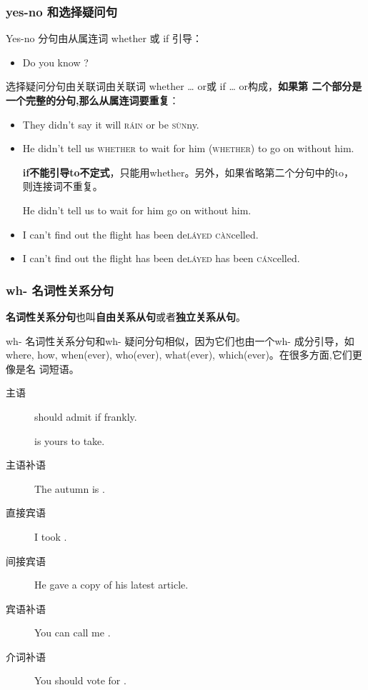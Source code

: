 \subsubsection{yes-no 和选择疑问句}

Yes-no 分句由从属连词 whether 或 if 引导：
\begin{itemize}
\item Do you know ?
\end{itemize}

选择疑问分句由关联词由关联词 whether \ldots{} or或 if \ldots{} or构成，\textbf{如果第
二个部分是一个完整的分句,那么从属连词要重复}：
\begin{itemize}
\item They didn't say  it will \textsc{r\'ain} or be \textsc{s\`un}ny.
\item He didn't tell us \textsc{whether} to wait for him 
  \textsc{(whether)} to go on without him.

  \textbf{if不能引导to不定式}，只能用whether。另外，如果省略第二个分句中的to，
  则连接词不重复。

  He didn't tell us  to wait for him  go on without him.

\item I can't find out  the flight has been de\textsc{l\'ayed}
   \textsc{c\`an}celled.

\item I can't find out  the flight has been de\textsc{l\'ayed} 
   has been \textsc{c\'an}celled.

\end{itemize}

\subsubsection{wh- 名词性关系分句}
\label{subsubsec:whnoun}

\textbf{名词性关系分句}也叫\textbf{自由关系从句}或者\textbf{独立关系从句}。

wh- 名词性关系分句和wh- 疑问分句相似，因为它们也由一个wh- 成分引导，如where,
how, when(ever), who(ever), what(ever), which(ever)。在很多方面,它们更像是名
词短语。
\begin{description}
\item[主语]  should admit if frankly.

   is yours to take.
\item[主语补语] The autumn is .
\item[直接宾语] I took .
\item[间接宾语] He gave  a copy of his latest article.
\item[宾语补语] You can call me .
\item[介词补语] You should vote for .
\end{description}

